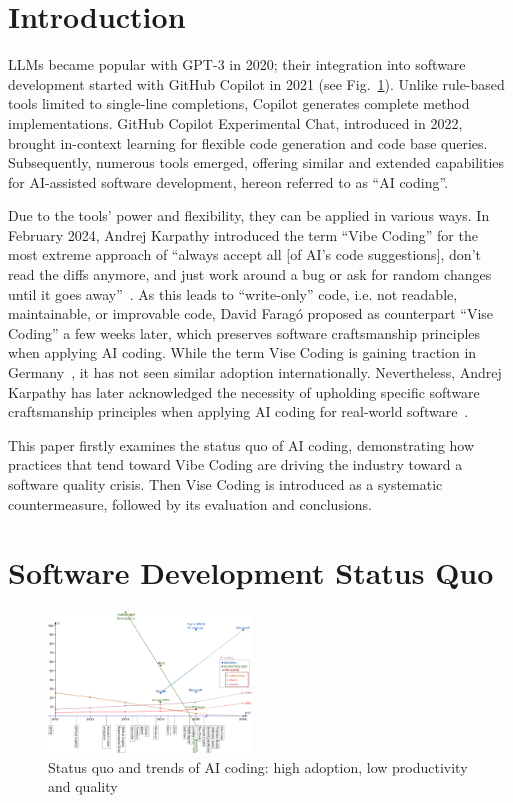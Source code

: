 \documentclass[twocolumn]{article}
\begin{document}
\section{Introduction}

LLMs became popular with GPT-3 in 2020;
their integration into software development started with GitHub Copilot in 2021 (see Fig.~\ref{fig:statusquo}). 
Unlike rule-based tools limited to single-line completions, Copilot generates complete method implementations.
GitHub Copilot Experimental Chat, introduced in 2022,
brought in-context learning for flexible code generation and code base queries. 
Subsequently, numerous tools emerged, offering similar and extended capabilities for
AI-assisted software development, hereon referred to as ``AI coding''.

Due to the tools' power and flexibility, they can be applied in various ways.
In February 2024, Andrej Karpathy introduced the term ``Vibe Coding'' for the most extreme approach of
``always accept all [of AI's code suggestions], don't read the diffs anymore, and just work around a bug
or ask for random changes until it goes away''~\cite{AK25}.
As this leads to ``write-only'' code, i.e. not readable, maintainable, or improvable code,
David Farag\'{o} proposed as counterpart ``Vise Coding'' a few weeks later,  
which preserves software craftsmanship principles when applying AI coding.
While the term Vise Coding is gaining traction in Germany~\cite{URL:ViseWikipediaDe},
it has not seen similar adoption internationally.
Nevertheless, Andrej Karpathy has later acknowledged the necessity of upholding
specific software craftsmanship principles when applying AI coding for real-world software~\cite{AK25c,AK25b}.

This paper firstly examines the status quo of AI coding,
demonstrating how practices that tend toward Vibe Coding are driving the industry toward a software quality crisis. 
Then Vise Coding is introduced as a systematic countermeasure, followed by its evaluation and conclusions.

\section{Software Development Status Quo}

\begin{figure}[hbt!]
  \begin{center}
  \vspace{-4mm}
  \includegraphics[width=0.48\textwidth]{figures/allStats_v4}
  \vspace{-7mm}
\caption{Status quo and trends of AI coding: high adoption, low productivity and quality}
\label{fig:statusquo}
\end{center}
\end{figure}
\end{document}
